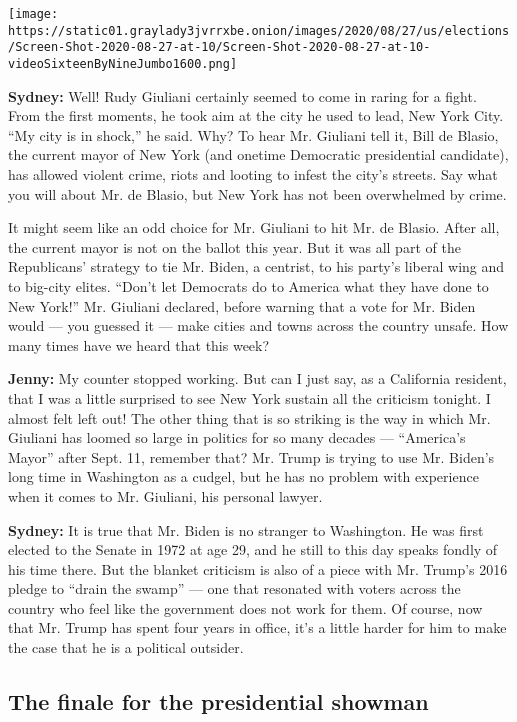 \texttt{[image: https://static01.graylady3jvrrxbe.onion/images/2020/08/27/us/elections/Screen-Shot-2020-08-27-at-10/Screen-Shot-2020-08-27-at-10-videoSixteenByNineJumbo1600.png]}

\textbf{Sydney:} Well! Rudy Giuliani certainly seemed to come in raring
for a fight. From the first moments, he took aim at the city he used to
lead, New York City. ``My city is in shock,'' he said. Why? To hear Mr.
Giuliani tell it, Bill de Blasio, the current mayor of New York (and
onetime Democratic presidential candidate), has allowed violent crime,
riots and looting to infest the city's streets. Say what you will about
Mr. de Blasio, but New York has not been overwhelmed by crime.

It might seem like an odd choice for Mr. Giuliani to hit Mr. de Blasio.
After all, the current mayor is not on the ballot this year. But it was
all part of the Republicans' strategy to tie Mr. Biden, a centrist, to
his party's liberal wing and to big-city elites. ``Don't let Democrats
do to America what they have done to New York!'' Mr. Giuliani declared,
before warning that a vote for Mr. Biden would --- you guessed it ---
make cities and towns across the country unsafe. How many times have we
heard that this week?

\textbf{Jenny:} My counter stopped working. But can I just say, as a
California resident, that I was a little surprised to see New York
sustain all the criticism tonight. I almost felt left out! The other
thing that is so striking is the way in which Mr. Giuliani has loomed so
large in politics for so many decades --- ``America's Mayor'' after
Sept. 11, remember that? Mr. Trump is trying to use Mr. Biden's long
time in Washington as a cudgel, but he has no problem with experience
when it comes to Mr. Giuliani, his personal lawyer.

\textbf{Sydney:} It is true that Mr. Biden is no stranger to Washington.
He was first elected to the Senate in 1972 at age 29, and he still to
this day speaks fondly of his time there. But the blanket criticism is
also of a piece with Mr. Trump's 2016 pledge to ``drain the swamp'' ---
one that resonated with voters across the country who feel like the
government does not work for them. Of course, now that Mr. Trump has
spent four years in office, it's a little harder for him to make the
case that he is a political outsider.

\hypertarget{the-finale-for-the-presidential-showman}{%
\subsection{The finale for the presidential
showman}\label{the-finale-for-the-presidential-showman}}

